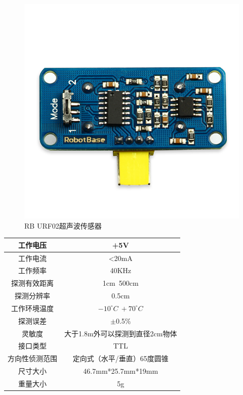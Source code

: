 \documentclass{ctexart}
\begin{document}
\begin{figure}[H]
\centering
    \includegraphics[width = \textwidth]{029}
    \caption{RB URF02超声波传感器}\par
\end{figure}
\begin{center}
\begin{longtable}{|c|c|}
\hline
工作电压&+5V\\
\hline
工作电流&<20mA\\
\hline
工作频率&40KHz\\
\hline
探测有效距离&1cm~500cm\\
\hline
探测分辨率&0.5cm\\
\hline
工作环境温度&$-10^{\circ}C~+70^{\circ}C$\\
\hline
探测误差&$\pm$0.5\%\\
\hline
灵敏度&大于1.8m外可以探测到直径2cm物体\\
\hline
接口类型&TTL\\
\hline
方向性侦测范围&定向式（水平/垂直）65度圆锥\\
\hline
尺寸大小&46.7mm*25.7mm*19mm\\
\hline
重量大小&5g\\
\hline
\end{longtable}
\end{center}
\end{document}
